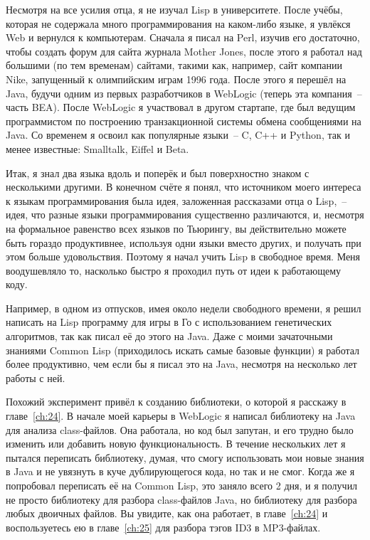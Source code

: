 Несмотря на все усилия отца, я не изучал Lisp в университете. После учёбы, которая
не содержала много программирования на каком-либо языке, я увлёкся Web и вернулся к
компьютерам. Сначала я писал на Perl, изучив его достаточно, чтобы создать форум для сайта
журнала Mother Jones, после этого я работал над большими (по тем временам) сайтами,
такими как, например, сайт компании Nike, запущенный к олимпийским играм 1996 года. После
этого я перешёл на Java, будучи одним из первых разработчиков в WebLogic (теперь эта
компания~-- часть BEA). После WebLogic я участвовал в другом стартапе, где был ведущим
программистом по построению транзакционной системы обмена сообщениями на Java. Со временем
я освоил как популярные языки~-- C, C++ и Python, так и менее известные: Smalltalk, Eiffel и Beta.

Итак, я знал два языка вдоль и поперёк и был поверхностно знаком с несколькими другими.
В конечном счёте я понял, что источником моего интереса к языкам программирования
была идея, заложенная рассказами отца о Lisp,~-- идея, что разные языки
программирования существенно различаются, и, несмотря на формальное равенство всех языков
по Тьюрингу, вы действительно можете быть гораздо продуктивнее, используя
одни языки вместо других, и получать при этом больше удовольствия. Поэтому я начал учить
Lisp в свободное время. Меня воодушевляло то, насколько быстро я проходил путь от идеи к
работающему коду.

Например, в одном из отпусков, имея около недели свободного времени, я решил написать
на Lisp программу для игры в Го с использованием генетических алгоритмов, так как писал её
до этого на Java. Даже с моими зачаточными знаниями Common Lisp (приходилось искать
самые базовые функции) я работал более продуктивно, чем если бы я писал это на Java,
несмотря на несколько лет работы с ней.

Похожий эксперимент привёл к созданию библиотеки, о которой я расскажу в главе~\ref{ch:24}. В
начале моей карьеры в WebLogic я написал библиотеку на Java для анализа class-файлов.
Она работала, но код был запутан, и его трудно было изменить или добавить новую функциональность.
В течение нескольких лет я пытался переписать библиотеку,
думая, что смогу использовать мои новые знания в Java и не увязнуть в куче дублирующегося
кода, но так и не смог. Когда же я попробовал переписать её на Common Lisp, это заняло всего
2 дня, и я получил не просто библиотеку для разбора class-файлов Java, но библиотеку для
разбора любых двоичных файлов. Вы увидите, как она работает, в главе~\ref{ch:24} и воспользуетесь
ею в главе~\ref{ch:25} для разбора тэгов ID3 в MP3-файлах.

